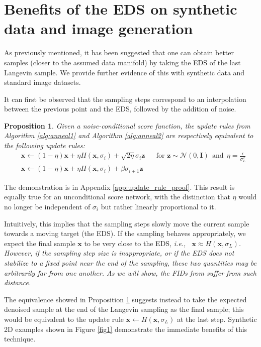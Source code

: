 \documentclass{article} \usepackage{iclr2021_conference_notitle,times}
\theoremstyle{definition}
\theoremstyle{definition}
\newtheorem{proposition}{Proposition}
\begin{document}
\section{Benefits of the EDS on synthetic data and image generation }\label{sec:sampling_improvements}

As previously mentioned, it has been suggested that one can obtain better samples (closer to the assumed data manifold) by taking the EDS of the last Langevin sample. We provide further evidence of this with synthetic data and standard image datasets. 

It can first be observed that the sampling steps correspond to an interpolation between the previous point and the EDS, followed by the addition of noise.

\begin{proposition}\label{prop:interp}
\em Given a noise-conditional score function, the update rules from Algorithm \ref{alg:anneal1} and Algorithm \ref{alg:anneal2} are respectively equivalent to the following update rules: \em 
\begin{align*} &\boldsymbol{x} \gets (1-\eta)\boldsymbol{x} + \eta H(\boldsymbol{x},\sigma_i) + \sqrt{2\eta}\sigma_i \boldsymbol{z}  && \text{for } \boldsymbol{z} \sim \mathcal{N}(0, \boldsymbol{I}) ~~ \text{and} ~~ \eta = \frac{\epsilon}{\sigma_L^2} \\
&\boldsymbol{x} \gets (1-\eta)\boldsymbol{x} + \eta H(\boldsymbol{x},\sigma_i) + \beta \sigma_{i+1} \boldsymbol{z}
\end{align*}
\end{proposition}

The demonstration is in Appendix \ref{app:update_rule_proof}. This result is equally true for an unconditional score network, with the distinction that $\eta$ would no longer be independent of $\sigma_i$ but rather linearly proportional to it.

Intuitively, this implies that the sampling steps slowly move the current sample towards a moving target (the EDS). If the sampling behaves appropriately, we expect the final sample $\boldsymbol{x}$ to be very close to the EDS, \em i.e.,\em ~  $\boldsymbol{x} \approx H(\boldsymbol{x}, \sigma_L)$. However, if the sampling step size is inappropriate, or if the EDS does not stabilize to a fixed point near the end of the sampling, these two quantities may be arbitrarily far from one another. As we will show, the FIDs from \citet{song2020improved} suffer from such  distance. 

The equivalence showed in Proposition \ref{prop:interp} suggests instead to take the expected denoised sample at the end of the Langevin sampling as the final sample; this would be equivalent to the update rule
$ \boldsymbol{x} \gets H(\boldsymbol{x}, \sigma_L)$ at the last step. Synthetic 2D examples shown in Figure \ref{fig1} demonstrate the immediate benefits of this technique.
\end{document}
